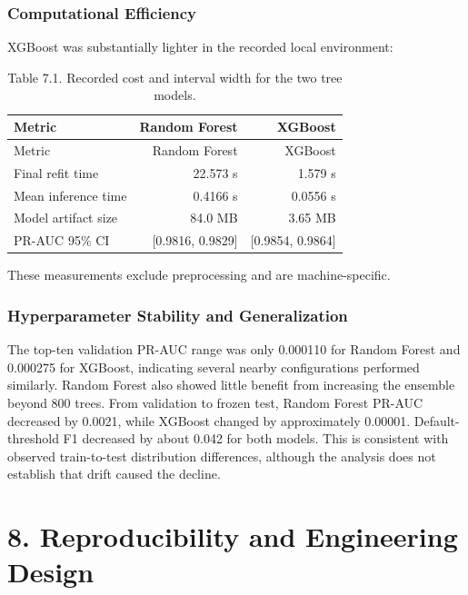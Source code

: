 \documentclass[
  canadian,
  12pt,
]{article}
\let\reportOrigSection\section
\renewcommand{\section}{\par\Needspace*{10\baselineskip}\reportOrigSection}%
\let\reportOrigSubsubsection\subsubsection
\renewcommand{\subsubsection}{\par\Needspace*{5\baselineskip}\reportOrigSubsubsection}%
\begin{document}
\subsubsection{Computational Efficiency}\label{computational-efficiency}

XGBoost was substantially lighter in the recorded local environment:

\begin{longtable}[]{@{}lrr@{}}
\caption{Table 7.1. Recorded cost and interval width for the two tree
models.}\tabularnewline
\toprule\noalign{}
Metric & Random Forest & XGBoost \\
\midrule\noalign{}
\endfirsthead
\toprule\noalign{}
Metric & Random Forest & XGBoost \\
\midrule\noalign{}
\endhead
\bottomrule\noalign{}
\endlastfoot
Final refit time & 22.573 s & 1.579 s \\
Mean inference time & 0.4166 s & 0.0556 s \\
Model artifact size & 84.0 MB & 3.65 MB \\
PR-AUC 95\% CI & {[}0.9816, 0.9829{]} & {[}0.9854, 0.9864{]} \\
\end{longtable}

These measurements exclude preprocessing and are machine-specific.

\subsubsection{Hyperparameter Stability and
Generalization}\label{hyperparameter-stability-and-generalization}

The top-ten validation PR-AUC range was only 0.000110 for Random Forest
and 0.000275 for XGBoost, indicating several nearby configurations
performed similarly. Random Forest also showed little benefit from
increasing the ensemble beyond 800 trees. From validation to frozen
test, Random Forest PR-AUC decreased by 0.0021, while XGBoost changed by
approximately 0.00001. Default-threshold F1 decreased by about 0.042 for
both models. This is consistent with observed train-to-test distribution
differences, although the analysis does not establish that drift caused
the decline.

\section[\texorpdfstring{\numberline{8.}Reproducibility and Engineering Design}{8. Reproducibility and Engineering Design}]{8. Reproducibility and Engineering Design}\label{sec-8}
\end{document}

